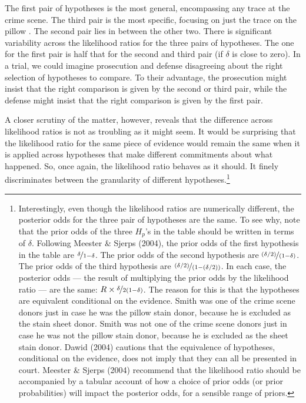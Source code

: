 \documentclass[
  10pt,
  dvipsnames,enabledeprecatedfontcommands]{scrartcl}
\begin{document}
\noindent The first pair of hypotheses is the most general, encompassing
any trace at the crime scene. The third pair is the most specific,
focusing on just the trace on the pillow . The second pair lies in
between the other two. There is significant variability across the
likelihood ratios for the three pairs of hypotheses. The one for the
first pair is half that for the second and third pair (if \(\delta\) is
close to zero). In a trial, we could imagine prosecution and defense
disagreeing about the right selection of hypotheses to compare. To their
advantage, the prosecution might insist that the right comparison is
given by the second or third pair, while the defense might insist that
the right comparison is given by the first pair.

A closer scrutiny of the matter, however, reveals that the difference
across likelihood ratios is not as troubling as it might seem. It would
be surprising that the likelihood ratio for the same piece of evidence
would remain the same when it is applied across hypotheses that make
different commitments about what happened. So, once again, the
likelihood ratio behaves as it should. It finely discriminates between
the granularity of different hypotheses.\footnote{Interestingly, even
  though the likelihood ratios are numerically different, the posterior
  odds for the three pair of hypotheses are the same. To see why, note
  that the prior odds of the three \(H_p\)'s in the table should be
  written in terms of \(\delta\). Following Meester \& Sjerps (2004),
  the prior odds of the first hypothesis in the table are
  \(\nicefrac{\delta}{1-\delta}\). The prior odds of the second
  hypothesis are \(\nicefrac{(\delta/2)}{(1-\delta)}\). The prior odds
  of the third hypothesis are \(\nicefrac{(\delta/2)}{(1-(\delta/2))}\).
  In each case, the posterior odds --- the result of multiplying the
  prior odds by the likelihood ratio --- are the same:
  \(R\times \nicefrac{\delta}{2(1-\delta)}\). The reason for this is
  that the hypotheses are equivalent conditional on the evidence. Smith
  was one of the crime scene donors just in case he was the pillow stain
  donor, because he is excluded as the stain sheet donor. Smith was not
  one of the crime scene donors just in case he was not the pillow stain
  donor, because he is excluded as the sheet stain donor. Dawid (2004)
  cautions that the equivalence of hypotheses, conditional on the
  evidence, does not imply that they can all be presented in court.
  Meester \& Sjerps (2004) recommend that the likelihood ratio should be
  accompanied by a tabular account of how a choice of prior odds (or
  prior probabilities) will impact the posterior odds, for a sensible
  range of priors.}
\end{document}
